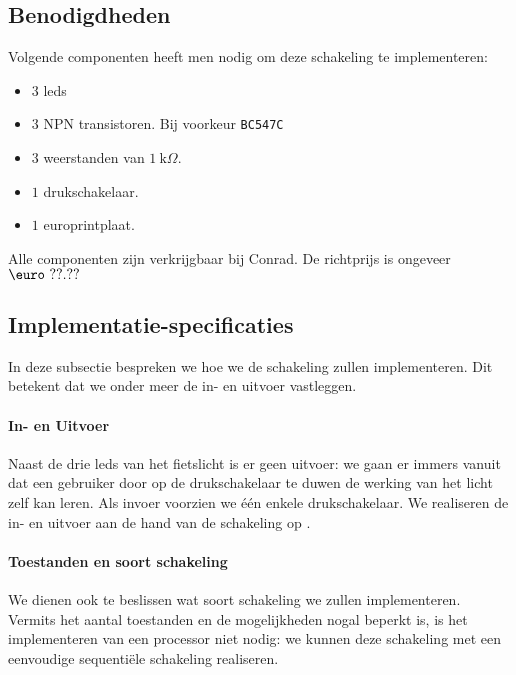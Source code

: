 \subsection{Benodigdheden}
Volgende componenten heeft men nodig om deze schakeling te implementeren:
\begin{itemize}
 \item $3$ leds
 \item $3$ NPN transistoren. Bij voorkeur \verb+BC547C+
 \item $3$ weerstanden van $1~\mbox{k}\Omega$.
 \item $1$ drukschakelaar.
 \item $1$ europrintplaat.
\end{itemize}
Alle componenten zijn verkrijgbaar bij Conrad. De richtprijs is ongeveer $\mbox{\euro}\ ??.??$
\subsection{Implementatie-specificaties}
In deze subsectie bespreken we hoe we de schakeling zullen implementeren. Dit betekent dat we onder meer de in- en uitvoer vastleggen.
\paragraph{In- en Uitvoer}
Naast de drie leds van het fietslicht is er geen uitvoer: we gaan er immers vanuit dat een gebruiker door op de drukschakelaar te duwen de werking van het licht zelf kan leren. Als invoer voorzien we \'e\'en enkele drukschakelaar. We realiseren de in- en uitvoer aan de hand van de schakeling op .
\paragraph{Toestanden en soort schakeling}
We dienen ook te beslissen wat soort schakeling we zullen implementeren. Vermits het aantal toestanden en de mogelijkheden nogal beperkt is, is het implementeren van een processor niet nodig: we kunnen deze schakeling met een eenvoudige sequenti\"ele schakeling realiseren.

